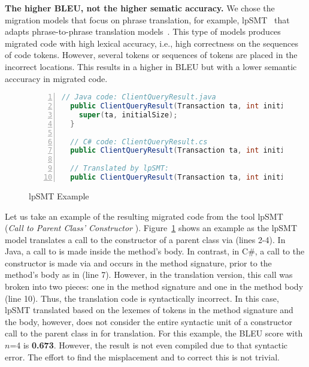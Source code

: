 {\bf The higher BLEU, not the higher sematic accuracy.} 
We chose the migration models that focus on phrase
translation, for example, lpSMT~\cite{fse13-nier,karaivanov14} that
adapts phrase-to-phrase translation models~\cite{phrasal10}. This type
of models produces migrated code with high lexical accuracy, i.e.,
high correctness on the sequences of code tokens. However, several
tokens or sequences of tokens are placed in the incorrect locations.
This results in a higher in BLEU but with a lower semantic
acccuracy in migrated code.


\begin{figure}[t]
\centering
\begin{lstlisting}[basicstyle=\small\sffamily, stepnumber=1, numbers=left, language=Java, aboveskip=1pt,  belowskip=1pt, numbersep=-5pt]
  // Java code: ClientQueryResult.java
  public ClientQueryResult(Transaction ta, int initialSize) {
    super(ta, initialSize);
  }

  // C# code: ClientQueryResult.cs
  public ClientQueryResult(Transaction ta, int initialSize) : base(ta, initialSize) {}

  // Translated by lpSMT:
  public ClientQueryResult(Transaction ta, int initialSize) : base(ta {, initialSize) ; }
\end{lstlisting}
\caption{lpSMT Example}
\label{fig:issueexample2}
\end{figure}


Let us take an example of the resulting migrated code from the tool
lpSMT~\cite{fse13-nier} ({\em Call to Parent Class' Constructor
  }). Figure~\ref{fig:issueexample2} shows an example
as the lpSMT model translates a call to the constructor of a parent
class via  (lines 2-4). In Java, a call to  is
made inside the method's body. In contrast, in C\#, a call to the
constructor is made via  and occurs in the method
signature, \ie prior to the method's body as in
 (line 7). However, in the translation
version, this call was broken into two pieces: one in the method
signature  and one in the method body  (line 10). Thus, the translation code is
syntactically incorrect. In this case, lpSMT translated based on the
lexemes of tokens in the method signature and the body, however, does
not consider the entire syntactic unit of a constructor call to the
parent class in  for translation. For this example, the
BLEU score with $n$=4 is {\bf 0.673}. However, the result is not even
compiled due to that syntactic error. The effort to find the
misplacement and to correct this is not trivial.

